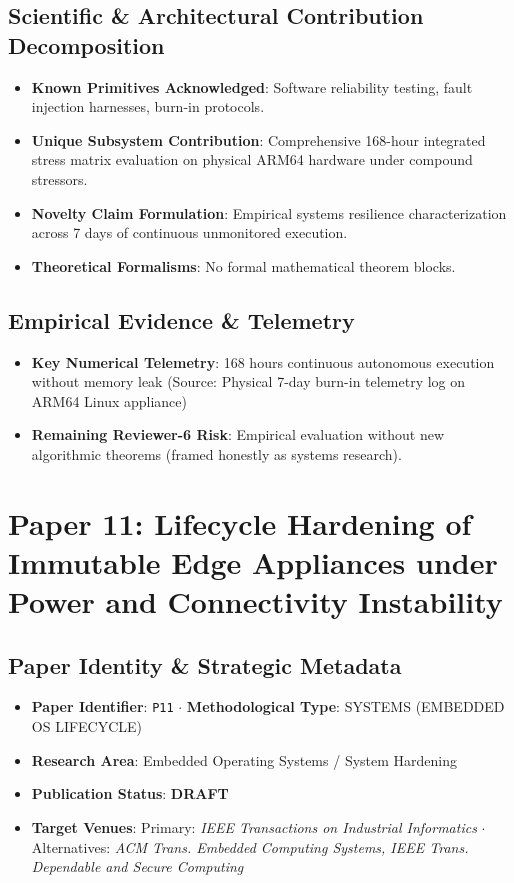 \documentclass[11pt,a4paper]{article}
\begin{document}
\subsection*{Scientific & Architectural Contribution Decomposition}
\begin{itemize}[leftmargin=1.5em, itemsep=0.2em]
    \item \textbf{Known Primitives Acknowledged}: Software reliability testing, fault injection harnesses, burn-in protocols.
    \item \textbf{Unique Subsystem Contribution}: Comprehensive 168-hour integrated stress matrix evaluation on physical ARM64 hardware under compound stressors.
    \item \textbf{Novelty Claim Formulation}: Empirical systems resilience characterization across 7 days of continuous unmonitored execution.
    \item \textbf{Theoretical Formalisms}: No formal mathematical theorem blocks.
\end{itemize}

\subsection*{Empirical Evidence & Telemetry}
\begin{itemize}[leftmargin=1.5em, itemsep=0.2em]
    \item \textbf{Key Numerical Telemetry}: 168 hours continuous autonomous execution without memory leak (Source: Physical 7-day burn-in telemetry log on ARM64 Linux appliance)
    \item \textbf{Remaining Reviewer-6 Risk}: Empirical evaluation without new algorithmic theorems (framed honestly as systems research).
\end{itemize}

\section{Paper 11: Lifecycle Hardening of Immutable Edge Appliances under Power and Connectivity Instability}

\subsection*{Paper Identity \& Strategic Metadata}
\begin{itemize}[leftmargin=1.5em, itemsep=0.2em]
    \item \textbf{Paper Identifier}: \texttt{P11} $\cdot$ \textbf{Methodological Type}: SYSTEMS (EMBEDDED OS LIFECYCLE)
    \item \textbf{Research Area}: Embedded Operating Systems / System Hardening
    \item \textbf{Publication Status}: \textbf{DRAFT}
    \item \textbf{Target Venues}: Primary: \textit{IEEE Transactions on Industrial Informatics} $\cdot$ Alternatives: \textit{ACM Trans. Embedded Computing Systems, IEEE Trans. Dependable and Secure Computing}
\end{itemize}
\end{document}

